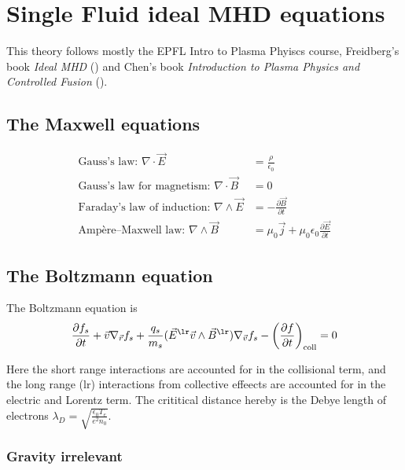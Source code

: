 \chapter{Single Fluid ideal MHD equations}

This theory follows mostly the EPFL Intro to Plasma Phyiscs course, Freidberg's book \emph{Ideal MHD} 
(\cite{Freidberg2014}) and Chen's book \emph{Introduction to Plasma Physics and Controlled Fusion} (\cite{Chen2016}).

\section{The Maxwell equations}

\begin{align}
    \text{Gauss's law: } \nabla \cdot \vec{E} &= \frac{\rho}{\epsilon_0} \label{eq:gauss_e} \\
    \text{Gauss's law for magnetism: } \nabla \cdot \vec{B} &= 0 \label{eq:gauss_b} \\
    \text{Faraday's law of induction: } \nabla \wedge \vec{E} &= -\frac{\partial \vec{B}}{\partial t} \label{eq:faraday} \\
    \text{Ampère–Maxwell law: }  \nabla \wedge \vec{B} &= \mu_0 \vec{j} + \mu_0 \epsilon_0 \frac{\partial \vec{E}}{\partial t} \label{eq:ampere}
\end{align}

\section{The Boltzmann equation}
The Boltzmann equation is
\begin{equation}
    \frac{\partial f_s}{\partial t} + \vec{v} \nabla_{\vec{r}} f_s + \frac{q_s}{m_s}(\vec{E}^{\lr} \vec{v}\wedge \vec{B}^{\lr} ) \nabla_{\vec{v}} f_s - \left(\frac{\partial f}{\partial t}\right)_{\operatorname{coll}} = 0
\end{equation}

Here the short range interactions are accounted for in the collisional term, and the long range (lr) interactions from collective effeects are accounted for in the electric and Lorentz term.
The crititical distance hereby is the Debye length of electrons $\lambda_{D} = \sqrt{\frac{\epsilon_0 T_e}{e^2 n_0}}$.

\subsection{Gravity irrelevant}

